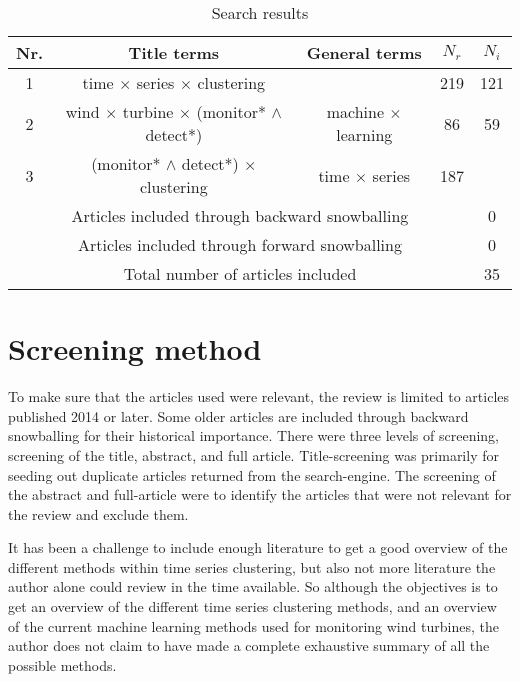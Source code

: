 \begin{table}[h]
    \centering
    \begin{tabular}{ |c|c|c|c|c| } 
    \hline
    Nr. & Title terms & General terms & $N_r$ & $N_i$ \\
    \hline
    \hline
    1 & time $\times$ series $\times$ clustering &  & 219 & 121 \\ 
    \hline
    2 & wind $\times$ turbine $\times$ (monitor* $\wedge{}$ detect*) & machine $\times$ learning & 86 & 59 \\ 
    \hline
    3 & (monitor* $\wedge{}$ detect*) $\times$ clustering & time $\times$ series & 187 &  \\
    \hline
    \multicolumn{4}{|c|}{Articles included through backward snowballing} & 0 \\
    \hline
    \multicolumn{4}{|c|}{Articles included through forward snowballing} & 0 \\
    \hline
    \hline
    \multicolumn{4}{|c|}{Total number of articles included} & 35 \\
    \hline
    \end{tabular}
    \caption{Search results}
    \label{tab:search_results}
\end{table}

\section{Screening method}
To make sure that the articles used were relevant, the review is limited to articles published 2014 or later. Some older articles are included through backward snowballing for their historical importance. There were three levels of screening, screening of the title, abstract, and full article. Title-screening was primarily for seeding out duplicate articles returned from the search-engine. The screening of the abstract and full-article were to identify the articles that were not relevant for the review and exclude them. \bigskip

It has been a challenge to include enough literature to get a good overview of the different methods within time series clustering, but also not more literature the author alone could review in the time available. So although the objectives is to get an overview of the different time series clustering methods, and an overview of the current machine learning methods used for monitoring wind turbines, the author does not claim to have made a complete exhaustive summary of all the possible methods. \bigskip

